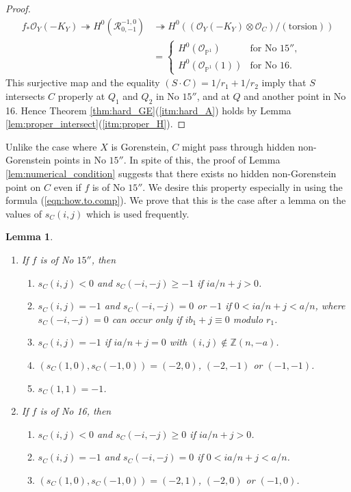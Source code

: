 \documentclass[a4paper,11pt]{amsart}
\newtheorem{lemma}[theorem]{Lemma}
\theoremstyle{definition}
\theoremstyle{remark}
\numberwithin{equation}{section}
\newcommand{\bP}{{\mathbb P}}
\newcommand{\bZ}{{\mathbb Z}}
\newcommand{\cO}{{\mathcal O}}
\newcommand{\calR}{{\mathcal R}}
\newcommand{\torsion}{\mathrm{torsion}}
\begin{document}
\begin{proof}
\begin{align*}
f_*\cO_Y(-K_Y) \twoheadrightarrow H^0(\calR_{0,-1}^{-1,0})
&\twoheadrightarrow H^0((\cO_Y(-K_Y) \otimes \cO_C)/(\torsion)) \\
&=
\begin{cases}
H^0(\cO_{\bP^1})    & \textrm{for No $\textrm{15}''$}, \\
H^0(\cO_{\bP^1}(1)) & \textrm{for No 16}.
\end{cases}
\end{align*}
This surjective map and the equality $(S \cdot C)=1/r_1+1/r_2$
imply that $S$ intersects $C$ properly at
$Q_1$ and $Q_2$ in No $\textrm{15}''$,
and at $Q$ and another point in No 16.
Hence Theorem \ref{thm:hard_GE}(\ref{itm:hard_A}) holds
by Lemma \ref{lem:proper_intersect}(\ref{itm:proper_H}).
\end{proof}

Unlike the case where $X$ is Gorenstein,
$C$ might pass through hidden non-Gorenstein points in No $\textrm{15}''$.
In spite of this,
the proof of Lemma \ref{lem:numerical_condition} suggests that
there exists no hidden non-Gorenstein point on $C$
even if $f$ is of No $\textrm{15}''$.
We desire this property especially
in using the formula (\ref{eqn:how.to.comp}).
We prove that this is the case after a lemma
on the values of $s_C(i,j)$ which is used frequently.

\begin{lemma}\label{lem:s}
\begin{enumerate}
\item\label{itm:s_15}
If $f$ is of No $\textrm{15}''$, then
\begin{enumerate}
\item
$s_C(i,j)<0$ and $s_C(-i,-j) \ge -1$ if $ia/n+j>0$.
\item
$s_C(i,j)=-1$ and $s_C(-i,-j)=0$ or $-1$ if $0<ia/n+j<a/n$,
where $s_C(-i,-j)=0$ can occur only if $ib_1+j \equiv 0$ modulo $r_1$.
\item
$s_C(i,j)=-1$ if $ia/n+j=0$ with $(i,j)\notin\bZ(n,-a)$.
\item
$(s_C(1,0),s_C(-1,0))=(-2,0)$, $(-2,-1)$ or $(-1,-1)$.
\item
$s_C(1,1)=-1$.
\end{enumerate}
\item\label{itm:s_16}
If $f$ is of No 16, then
\begin{enumerate}
\item
$s_C(i,j)<0$ and $s_C(-i,-j) \ge 0$ if $ia/n+j>0$.
\item
$s_C(i,j)=-1$ and $s_C(-i,-j)=0$ if $0<ia/n+j<a/n$.
\item
$(s_C(1,0),s_C(-1,0))=(-2,1)$, $(-2,0)$ or $(-1,0)$.
\end{enumerate}
\end{enumerate}
\end{lemma}
\end{document}
